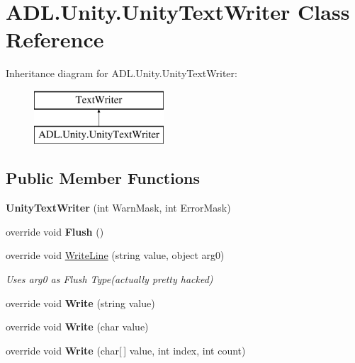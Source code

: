 \hypertarget{class_a_d_l_1_1_unity_1_1_unity_text_writer}{}\section{A\+D\+L.\+Unity.\+Unity\+Text\+Writer Class Reference}
\label{class_a_d_l_1_1_unity_1_1_unity_text_writer}
Inheritance diagram for A\+D\+L.\+Unity.\+Unity\+Text\+Writer\+:\begin{figure}[H]
\begin{center}
\leavevmode
\includegraphics[height=2.000000cm]{class_a_d_l_1_1_unity_1_1_unity_text_writer}
\end{center}
\end{figure}
\subsection*{Public Member Functions}
\begin{DoxyCompactItemize}
\item 
\mbox{\label{class_a_d_l_1_1_unity_1_1_unity_text_writer_ad037515e513a7f4c94d4cb2caf58b422}} 
{\bfseries Unity\+Text\+Writer} (int Warn\+Mask, int Error\+Mask)
\item 
\mbox{\label{class_a_d_l_1_1_unity_1_1_unity_text_writer_ad62666e8a12f473f34780dbfdbc71975}} 
override void {\bfseries Flush} ()
\item 
override void \mbox{\hyperlink{class_a_d_l_1_1_unity_1_1_unity_text_writer_a12b1bcfd083d9e771330d95d1857e569}{Write\+Line}} (string value, object arg0)
\begin{DoxyCompactList}\small\item\em Uses arg0 as Flush Type(actually pretty hacked) \end{DoxyCompactList}\item 
\mbox{\label{class_a_d_l_1_1_unity_1_1_unity_text_writer_ad951026a7b9df781b94fbc9a5274ac51}} 
override void {\bfseries Write} (string value)
\item 
\mbox{\label{class_a_d_l_1_1_unity_1_1_unity_text_writer_a9636a16d9e1f9b04d76d4087688bac3a}} 
override void {\bfseries Write} (char value)
\item 
\mbox{\label{class_a_d_l_1_1_unity_1_1_unity_text_writer_ace3ec2f343589f5a1d92145f5f61fb47}} 
override void {\bfseries Write} (char\mbox{[}$\,$\mbox{]} value, int index, int count)
\end{DoxyCompactItemize}
